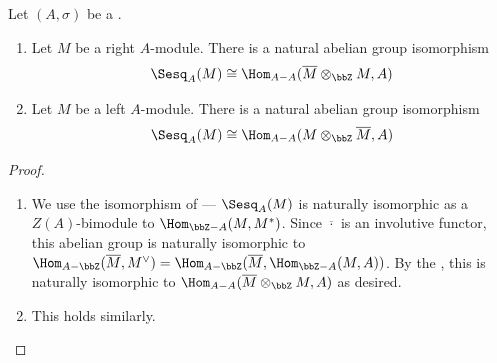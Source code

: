 
\begin{corollary} \label{corollary:seqsquilinear_forms_on_a_module_over_a_ring_with_involution_correspond_to_bimodule_maps_from_modules_tensored_by_opposites_to_ring}
    Let $(A,\sigma)$ be a . 
    \begin{enumerate}
        \item Let $M$ be a right $A$-module. There is a natural abelian group isomorphism
        $$\Sesq_A(M) \cong \Hom_{A-A}(\overline{M} \otimes_{\bbZ} M, A)$$

        \item Let $M$ be a left $A$-module. There is a natural abelian group isomorphism
        $$\Sesq_A(M) \cong \Hom_{A-A}(M \otimes_{\bbZ} \overline{M}, A)$$
    \end{enumerate}
\end{corollary}
\begin{proof}
    \begin{enumerate}
        \item We use the isomorphism of  --- $\Sesq_A(M)$ is naturally isomorphic as a $Z(A)$-bimodule to $\Hom_{\bbZ-A}(M,M^*)$. Since $\overline{\cdot}$ is an involutive functor, this abelian group is naturally isomorphic to $\Hom_{A-\bbZ}(\overline{M}, M^\vee) = \Hom_{A-\bbZ}(\overline{M}, \Hom_{\bbZ-A}(M,A))$. By the , this is naturally isomorphic to $\Hom_{A-A}(\overline{M} \otimes_{\bbZ} M, A)$ as desired.

        \item This holds similarly.
    \end{enumerate}
\end{proof}




